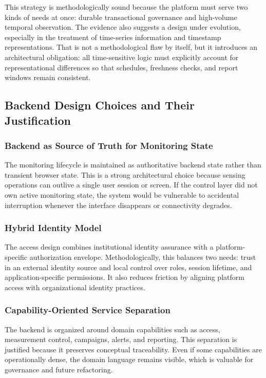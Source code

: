 \documentclass[11pt,a4paper]{article}
\begin{document}
This strategy is methodologically sound because the platform must serve two kinds of needs at once: durable transactional governance and high-volume temporal observation. The evidence also suggests a design under evolution, especially in the treatment of time-series information and timestamp representations. That is not a methodological flaw by itself, but it introduces an architectural obligation: all time-sensitive logic must explicitly account for representational differences so that schedules, freshness checks, and report windows remain consistent.

\subsection{Backend Design Choices and Their Justification}
\subsubsection{Backend as Source of Truth for Monitoring State}
The monitoring lifecycle is maintained as authoritative backend state rather than transient browser state. This is a strong architectural choice because sensing operations can outlive a single user session or screen. If the control layer did not own active monitoring state, the system would be vulnerable to accidental interruption whenever the interface disappears or connectivity degrades.

\subsubsection{Hybrid Identity Model}
The access design combines institutional identity assurance with a platform-specific authorization envelope. Methodologically, this balances two needs: trust in an external identity source and local control over roles, session lifetime, and application-specific permissions. It also reduces friction by aligning platform access with organizational identity practices.

\subsubsection{Capability-Oriented Service Separation}
The backend is organized around domain capabilities such as access, measurement control, campaigns, alerts, and reporting. This separation is justified because it preserves conceptual traceability. Even if some capabilities are operationally dense, the domain language remains visible, which is valuable for governance and future refactoring.
\end{document}
